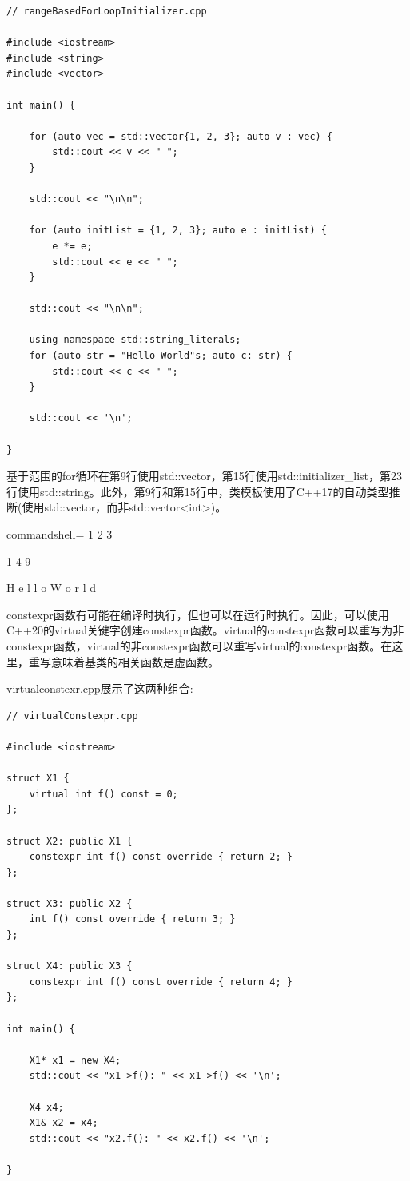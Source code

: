 \begin{lstlisting}[style=styleCXX]
// rangeBasedForLoopInitializer.cpp

#include <iostream>
#include <string>
#include <vector>

int main() {

	for (auto vec = std::vector{1, 2, 3}; auto v : vec) {
		std::cout << v << " ";
	}
	
	std::cout << "\n\n";
	
	for (auto initList = {1, 2, 3}; auto e : initList) {
		e *= e;
		std::cout << e << " ";
	}
	
	std::cout << "\n\n";
	
	using namespace std::string_literals;
	for (auto str = "Hello World"s; auto c: str) {
		std::cout << c << " ";
	}
	
	std::cout << '\n';

}
\end{lstlisting}

基于范围的for循环在第9行使用std::vector，第15行使用std::initializer\_list，第23行使用std::string。此外，第9行和第15行中，类模板使用了C++17的自动类型推断(使用std::vector，而非std::vector<int>)。

\begin{tcblisting}{commandshell={}}
1 2 3

1 4 9

H e l l o  W o r l d
\end{tcblisting}


constexpr函数有可能在编译时执行，但也可以在运行时执行。因此，可以使用C++20的virtual关键字创建constexpr函数。virtual的constexpr函数可以重写为非constexpr函数，virtual的非constexpr函数可以重写virtual的constexpr函数。在这里，重写意味着基类的相关函数是虚函数。

virtualconstexr.cpp展示了这两种组合:

\begin{lstlisting}[style=styleCXX]
// virtualConstexpr.cpp

#include <iostream>

struct X1 {
	virtual int f() const = 0;
};

struct X2: public X1 {
	constexpr int f() const override { return 2; }
};

struct X3: public X2 {
	int f() const override { return 3; }
};

struct X4: public X3 {
	constexpr int f() const override { return 4; }
};

int main() {
	
	X1* x1 = new X4;
	std::cout << "x1->f(): " << x1->f() << '\n';
	
	X4 x4;
	X1& x2 = x4;
	std::cout << "x2.f(): " << x2.f() << '\n';

}
\end{lstlisting}

